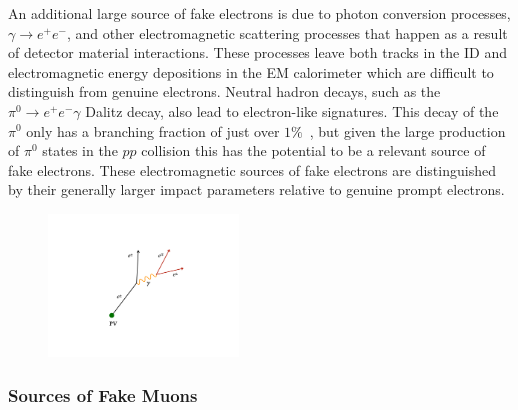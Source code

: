 An additional large source of fake electrons is due to photon conversion processes,
$\gamma \rightarrow e^+ e^-$, and other electromagnetic scattering processes
that happen as a result of detector material interactions.
These processes leave both tracks in the ID and electromagnetic energy depositions
in the EM calorimeter which are difficult to distinguish from genuine electrons.
Neutral hadron decays, such as the $\pi^0 \rightarrow e^+ e^- \gamma$ Dalitz decay,
also lead to electron-like signatures.
This decay of the $\pi^0$ only has a branching fraction of just over $1\%$~\cite{PDGRef}, but given
the large production of $\pi^0$ states in the $pp$ collision this has the potential to be
a relevant source of fake electrons.
These electromagnetic sources of fake electrons are distinguished by their generally
larger impact parameters relative to genuine prompt electrons.

\begin{figure}[!htb]
    \begin{center}
        \includegraphics[width=0.45\textwidth]{figures/common_ana/fakes/electron_brem_fake}
        \caption{
        }
        \label{fig:electron_brem_fake}
    \end{center}
\end{figure}


%
%
\subsubsection{Sources of Fake Muons}
\label{sec:fake_muon_sources}

